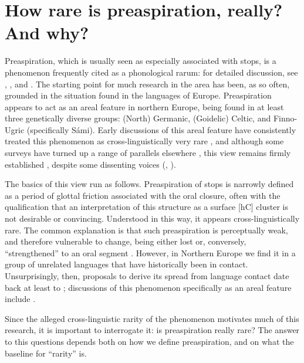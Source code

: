 \documentclass[output=paper,colorlinks,citecolor=brown]{langscibook}
\begin{document}
\section{How rare is preaspiration, really? And why?}
\label{sec:how-rare-preasp}
\begin{sloppypar}
Preaspiration, which is usually seen as especially associated with {\VOICELESS} stops, is a phenomenon frequently cited as a phonological rarum: for detailed discussion, see \textcite{silverman03}, , and . The starting point for much research in the area has been, as so often, grounded in the situation found in the languages of Europe. Preaspiration appears to act as an areal feature in northern Europe, being found in at least three genetically diverse groups: (North) Germanic, (Goidelic) Celtic, and Finno-Ugric (specifically Sámi). Early discussions of this areal feature have consistently treated this phenomenon as cross\hyp linguistically very rare \parencite[e.\,g.][]{marstrander1932okklusiver, wagner1964nordeuropäische}, and although some surveys have turned up a range of parallels elsewhere \parencite{liberman84:_german, silverman03}, this view remains firmly established \parencite{salmons92:_accen, hansson2001remains, blevins2017areal}, despite some dissenting voices (\citealt{Clayton2010}, ).
\end{sloppypar}

The basics of this view run as follows. Preaspiration of {\VOICELESS} stops is narrowly defined as a period of glottal friction associated with the oral closure, often with the qualification that an interpretation of this structure as a surface [hC] cluster is not desirable or convincing. Understood in this way, it appears cross-linguistically rare. The common explanation is that such preaspiration is perceptually weak, and therefore vulnerable to change, being either lost or, conversely, \enquote{strengthened} to an oral segment \parencite{silverman03}. However, in Northern Europe we find it in a group of unrelated languages that have historically been in contact. Unsurprisingly, then, proposals to derive its spread from language contact date back at least to \textcite{marstrander1932okklusiver}; discussions of this phenomenon specifically as an areal feature include \textcite{wagner1964nordeuropäische,borgstroem74,salmons92:_accen,eliasson2000typologiska,hansson2001remains,rießler2008substratsprachen,blevins2017areal}.

Since the alleged cross\hyp linguistic rarity of the phenomenon motivates much of this research, it is important to interrogate it: is preaspiration really rare? The answer to this questions depends both on how we define preaspiration, and on what the baseline for \enquote{rarity} is.
\end{document}
